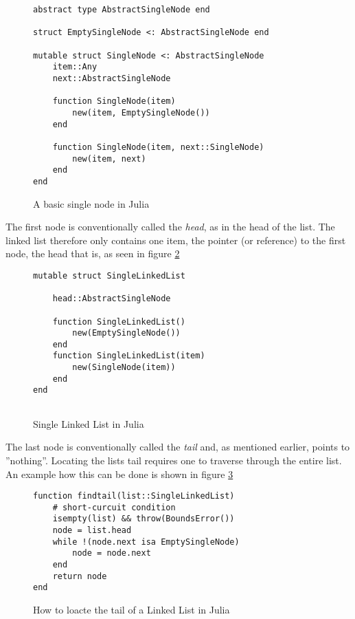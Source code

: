 \documentclass[a4paper, 11pt]{article}
\begin{document}
    \begin{figure}[H]
    \begin{verbatim}
abstract type AbstractSingleNode end

struct EmptySingleNode <: AbstractSingleNode end

mutable struct SingleNode <: AbstractSingleNode
    item::Any
    next::AbstractSingleNode

    function SingleNode(item) 
        new(item, EmptySingleNode())
    end

    function SingleNode(item, next::SingleNode)
        new(item, next)
    end
end
    \end{verbatim}
    \caption{A basic single node in Julia}
    \label{code:SingleNode}
    \end{figure}
    
    \clearpage
    
    The first node is conventionally called the \emph{head}, as in the head of the list. 
    The linked list therefore only contains one item, the pointer (or reference) to the first node, the 
    head that is, as seen in figure \ref{code:SingleList}
    
    \begin{figure}[H]
    \begin{verbatim}
mutable struct SingleLinkedList

    head::AbstractSingleNode

    function SingleLinkedList()
        new(EmptySingleNode())
    end
    function SingleLinkedList(item)
        new(SingleNode(item))
    end
end
        
    \end{verbatim}
    \caption{Single Linked List in Julia}
    \label{code:SingleList}
    \end{figure}

    The last node is conventionally called the \emph{tail} and, as mentioned earlier, points to ''nothing''.
    Locating the lists tail requires one to traverse through the entire list.
    An example how this can be done is shown in figure \ref{code:findtail}
    
    \begin{figure}[H]
    \begin{verbatim}
function findtail(list::SingleLinkedList)
    # short-curcuit condition
    isempty(list) && throw(BoundsError())
    node = list.head
    while !(node.next isa EmptySingleNode)
        node = node.next
    end
    return node
end
    \end{verbatim}
    \caption{How to loacte the tail of a Linked List in Julia}
    \label{code:findtail}
    \end{figure}
     
\end{document}
